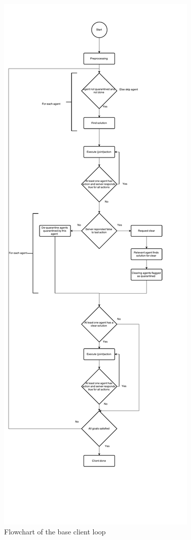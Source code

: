 \documentclass[letterpaper]{article}
\begin{document}
\begin{figure}[!htb]
\centering
\includegraphics[scale=0.45]{ClientFlowchart.pdf}
\caption{Flowchart of the base client loop}
\label{fig:clientFlowchart}
\end{figure}
\end{document}
